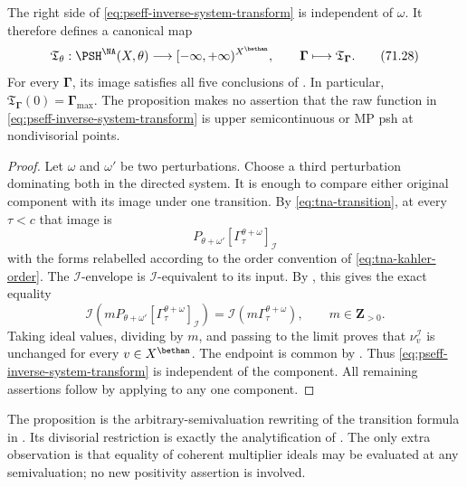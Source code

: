 \begin{proposition}\label{thm:pseff-perturbation-independent-transform}
The right side of \eqref{eq:pseff-inverse-system-transform} is independent
of \(\omega\).  It therefore defines a canonical map
\[
 \mathfrak T_\theta:
 \PSH^{\NA}(X,\theta)
 \longrightarrow[-\infty,+\infty)^{X^{\bethan}},
 \qquad
 \boldsymbol\Gamma\longmapsto
 \mathfrak T_{\boldsymbol\Gamma}.
\tag{71.28}\label{eq:pseff-canonical-transform-map}
\]
For every \(\boldsymbol\Gamma\), its image satisfies all five conclusions
of .  In particular,
\(\mathfrak T_{\boldsymbol\Gamma}(0)=\boldsymbol\Gamma_{\max}\).
The proposition makes no assertion that the raw function in
\eqref{eq:pseff-inverse-system-transform} is upper semicontinuous or MP
psh at nondivisorial points.
\end{proposition}

\begin{proof}
Let \(\omega\) and \(\omega'\) be two perturbations.  Choose a third
perturbation dominating both in the directed system.  It is enough to
compare either original component with its image under one transition.
By \eqref{eq:tna-transition}, at every \(\tau<c\) that image is
\[
 P_{\theta+\omega'}
 [\Gamma^{\theta+\omega}_\tau]_{\mathcal I}
\tag{71.29}\label{eq:pseff-transition-level}
\]
with the forms relabelled according to the order convention of
\eqref{eq:tna-kahler-order}.  The \(\mathcal I\)-envelope is
\(\mathcal I\)-equivalent to its input.  By
, this gives the exact equality
\[
 \mathcal I\!\left(mP_{\theta+\omega'}
 [\Gamma^{\theta+\omega}_\tau]_{\mathcal I}\right)
 =\mathcal I(m\Gamma^{\theta+\omega}_\tau),
 \qquad m\in\mathbf Z_{>0}.
\tag{71.30}\label{eq:pseff-transition-ideal-equality}
\]
Taking ideal values, dividing by \(m\), and passing to the limit proves
that \(\nu_v^{\mathcal I}\) is unchanged for every
\(v\in X^{\bethan}\).  The endpoint is common by
.  Thus
\eqref{eq:pseff-inverse-system-transform} is independent of the
component.  All remaining assertions follow by applying
 to any one component.
\end{proof}

The proposition is the arbitrary-semivaluation rewriting of the transition
formula in \cite[Definition~3.3]{DXZ23}.  Its divisorial restriction is
exactly the analytification of
\cite[Definition~3.11]{Xia23Operations}.  The only extra observation is
that equality of coherent multiplier ideals may be evaluated at any
semivaluation; no new positivity assertion is involved.

